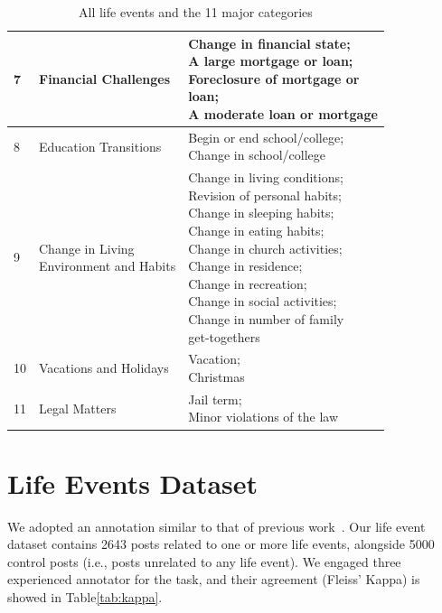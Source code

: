 \begin{table}[th]
\begin{tabular}{m{0.2cm}m{2.8cm}m{3.5cm}}
    7 & Financial Challenges &  \makecell[l]{Change in financial state;\\A large mortgage or loan;\\Foreclosure of mortgage or\\ loan;\\A moderate loan or mortgage} \\ \hline
    8 & Education Transitions &  \makecell[l]{Begin or end school/college;\\Change in school/college} \\ \hline
    9 & \makecell[l]{Change in Living\\ Environment and Habits} &  \makecell[l]{Change in living conditions;\\Revision of personal habits;\\Change in sleeping habits;\\Change in eating habits;\\Change in church activities;\\Change in residence;\\Change in recreation;\\Change in social activities;\\Change in number of family \\get-togethers }\\ \hline    
    10 & Vacations and Holidays & \makecell[l]{Vacation;\\Christmas} \\ \hline
    11 & Legal Matters &  \makecell[l]{Jail term;\\Minor violations of the law }\\
    \hline
    \end{tabular}
    \caption{All life events and the 11 major categories}
    \label{tab:all_LEs}
\end{table}

\section{Life Events Dataset}
\label{apd:LE_dataset}
We adopted an annotation similar to that of previous work~\cite{Zhang2022SymptomIF}. Our life event dataset contains 2643 posts related to one or more life events, alongside 5000 control posts (i.e., posts unrelated to any life event). We engaged three experienced annotator for the task, and their agreement (Fleiss' Kappa) is showed in Table\ref{tab:kappa}.


